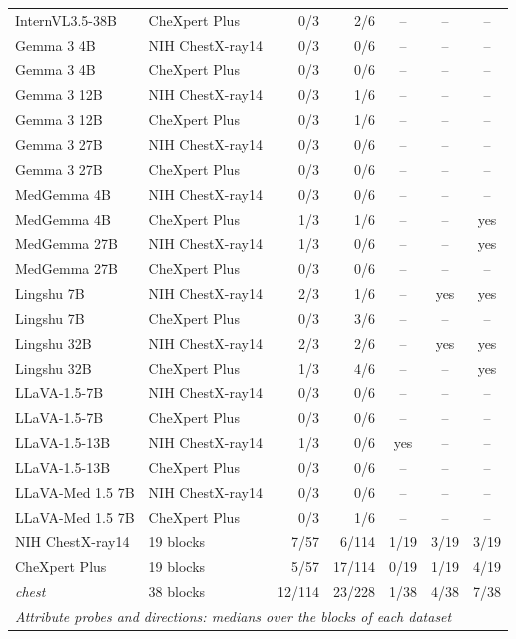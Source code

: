 \documentclass{article}
\begin{document}
\begin{table}[htbp]
{\begin{tabular}{llrrccc}
InternVL3.5-38B & CheXpert Plus & 0/3 & 2/6 & -- & -- & -- \\
Gemma 3 4B & NIH ChestX-ray14 & 0/3 & 0/6 & -- & -- & -- \\
Gemma 3 4B & CheXpert Plus & 0/3 & 0/6 & -- & -- & -- \\
Gemma 3 12B & NIH ChestX-ray14 & 0/3 & 1/6 & -- & -- & -- \\
Gemma 3 12B & CheXpert Plus & 0/3 & 1/6 & -- & -- & -- \\
Gemma 3 27B & NIH ChestX-ray14 & 0/3 & 0/6 & -- & -- & -- \\
Gemma 3 27B & CheXpert Plus & 0/3 & 0/6 & -- & -- & -- \\
MedGemma 4B & NIH ChestX-ray14 & 0/3 & 0/6 & -- & -- & -- \\
MedGemma 4B & CheXpert Plus & 1/3 & 1/6 & -- & -- & yes \\
MedGemma 27B & NIH ChestX-ray14 & 1/3 & 0/6 & -- & -- & yes \\
MedGemma 27B & CheXpert Plus & 0/3 & 0/6 & -- & -- & -- \\
Lingshu 7B & NIH ChestX-ray14 & 2/3 & 1/6 & -- & yes & yes \\
Lingshu 7B & CheXpert Plus & 0/3 & 3/6 & -- & -- & -- \\
Lingshu 32B & NIH ChestX-ray14 & 2/3 & 2/6 & -- & yes & yes \\
Lingshu 32B & CheXpert Plus & 1/3 & 4/6 & -- & -- & yes \\
LLaVA-1.5-7B & NIH ChestX-ray14 & 0/3 & 0/6 & -- & -- & -- \\
LLaVA-1.5-7B & CheXpert Plus & 0/3 & 0/6 & -- & -- & -- \\
LLaVA-1.5-13B & NIH ChestX-ray14 & 1/3 & 0/6 & yes & -- & -- \\
LLaVA-1.5-13B & CheXpert Plus & 0/3 & 0/6 & -- & -- & -- \\
LLaVA-Med 1.5 7B & NIH ChestX-ray14 & 0/3 & 0/6 & -- & -- & -- \\
LLaVA-Med 1.5 7B & CheXpert Plus & 0/3 & 1/6 & -- & -- & -- \\
\midrule
NIH ChestX-ray14 & 19 blocks & 7/57 & 6/114 & 1/19 & 3/19 & 3/19 \\
CheXpert Plus & 19 blocks & 5/57 & 17/114 & 0/19 & 1/19 & 4/19 \\
\textit{chest} & 38 blocks & 12/114 & 23/228 & 1/38 & 4/38 & 7/38 \\
\midrule
\multicolumn{7}{l}{\textit{Attribute probes and directions: medians over the blocks of each dataset}} \\

\end{tabular}}
\end{table}
\end{document}
